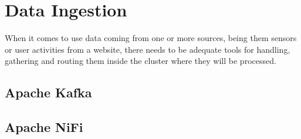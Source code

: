 \chapter{Data Ingestion}

When it comes to use data coming from one or more sources, being them sensors or user activities from a website, there needs to be adequate tools for handling, gathering and routing them inside the cluster where they will be processed.

\section{Apache Kafka}

\section{Apache NiFi}